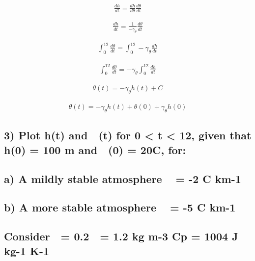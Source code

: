 \documentclass[11pt]{article}
\begin{document}
    \begin{align}
\frac{dh}{dt} = \frac{dh}{d\theta} \frac{d\theta}{dt}
\end{align}

    \begin{align}
\frac{dh}{dt} = \frac{1}{-\gamma_\theta} \frac{d\theta}{dt}
\end{align}

    \begin{align}
\int_0^{12} \frac{d\theta}{dt} = \int_0^{12} -\gamma_\theta \frac{dh}{dt}
\end{align}

    \begin{align}
\int_0^{12} \frac{d\theta}{dt} = -\gamma_\theta \int_0^{12} \frac{dh}{dt}
\end{align}

    \begin{align}
\theta(t) = -\gamma_\theta h(t) + C
\end{align}

    \begin{align}
\theta(t) = -\gamma_\theta h(t) + \theta (0) + \gamma_\theta h(0)
\end{align}

    \hypertarget{plot-ht-and-t-for-0-t-12-given-that-h0-100-m-and-0-20c-for}{%
\subsection{3) Plot h(t) and  (t) for 0 \textless{} t \textless{} 12,
given that h(0) = 100 m and  (0) = 20C,
for:}\label{plot-ht-and-t-for-0-t-12-given-that-h0-100-m-and-0-20c-for}}

\hypertarget{a-a-mildly-stable-atmosphere--2-c-km-1}{%
\subsection{a) A mildly stable atmosphere  = -2 C
km-1}\label{a-a-mildly-stable-atmosphere--2-c-km-1}}

\hypertarget{b-a-more-stable-atmosphere--5-c-km-1}{%
\subsection{b) A more stable atmosphere  = -5 C
km-1}\label{b-a-more-stable-atmosphere--5-c-km-1}}

\hypertarget{consider-0.2-1.2-kg-m-3-cp-1004-j-kg-1-k-1}{%
\subsection{Consider  = 0.2  = 1.2 kg m-3 Cp = 1004 J kg-1
K-1}\label{consider-0.2-1.2-kg-m-3-cp-1004-j-kg-1-k-1}}
\end{document}
